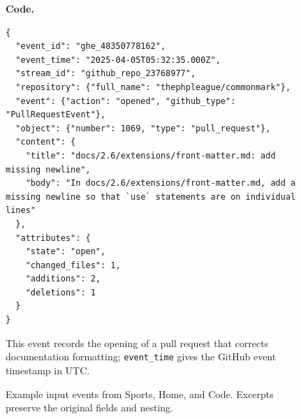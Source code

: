 \begin{figure}[p]
\par\medskip
\begin{minipage}{\textwidth}
\textbf{Code.}
\begin{lstlisting}[style=inputevent]
{
  "event_id": "ghe_48350778162",
  "event_time": "2025-04-05T05:32:35.000Z",
  "stream_id": "github_repo_23768977",
  "repository": {"full_name": "thephpleague/commonmark"},
  "event": {"action": "opened", "github_type": "PullRequestEvent"},
  "object": {"number": 1069, "type": "pull_request"},
  "content": {
    "title": "docs/2.6/extensions/front-matter.md: add missing newline",
    "body": "In docs/2.6/extensions/front-matter.md, add a missing newline so that `use` statements are on individual lines"
  },
  "attributes": {
    "state": "open",
    "changed_files": 1,
    "additions": 2,
    "deletions": 1
  }
}
\end{lstlisting}
This event records the opening of a pull request that corrects documentation formatting; \texttt{event\_time} gives the GitHub event timestamp in UTC.
\end{minipage}
\caption{Example input events from Sports, Home, and Code. Excerpts preserve the original fields and nesting.}
\label{fig:input_event_examples}
\end{figure}
